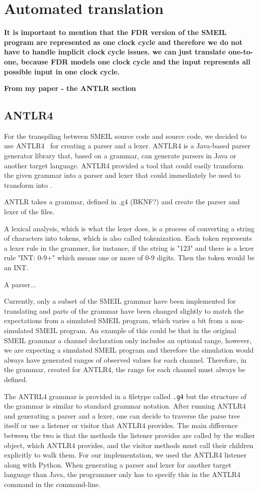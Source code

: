 \section{Automated translation}
 \textbf{It is important to mention that the FDR version of the SMEIL program are represented as one clock cycle and therefore we do not have to handle implicit clock cycle issues. we can just translate one-to-one, because FDR models one clock cycle and the input represents all possible input in one clock cycle.}

 \textbf{From my paper - the ANTLR section}
\subsection{ANTLR4}
For the transpiling between SMEIL source code and \cspm{} source code, we decided to use ANTLR4~\cite{antlr} for creating a parser and a lexer. ANTLR4 is a Java-based parser generator library that, based on a grammar, can generate parsers in Java or another target language. ANTLR4 provided a tool that could easily transform the given grammar into a parser and lexer that could immediately be used to transform into \cspm{}.

ANTLR takes a grammar, defined in .g4 (BKNF?) and create the parser and lexer of the files.

A lexical analysis, which is what the lexer does, is a process of converting a string of characters into tokens, which is also called tokenization. Each token represents a lexer rule in the grammer, for instance, if the string is "123" and there is a lexer rule "INT: {0-9}+" which means one or more of 0-9 digits. Then the token would be an INT.

A parser...

Currently, only a subset of the SMEIL grammar have been implemented for translating and parts of the grammar have been changed slightly to match the expectations from a simulated SMEIL program, which varies a bit from a non-simulated SMEIL program. An example of this could be that in the original SMEIL grammar a channel declaration only includes an optional range, however, we are expecting a simulated SMEIL program and therefore the simulation would always have generated ranges of observed values for each channel. Therefore, in the grammar, created for ANTLR4, the range for each channel must always be defined.

The ANTRL4 grammar is provided in a filetype called \texttt{.g4} but the structure of the grammar is similar to standard grammar notation.
After running ANTLR4 and generating a parser and a lexer, one can decide to traverse the parse tree itself or use a listener or visitor that ANTLR4 provides. The main difference between the two is that the methods the listener provides are called by the walker object, which ANTLR4 provides, and the visitor methods must call their children explicitly to walk them.
For our implementation, we used the ANTLR4 listener along with Python. When generating a parser and lexer for another target language than Java, the programmer only has to specify this in the ANTLR4 command in the command-line.
